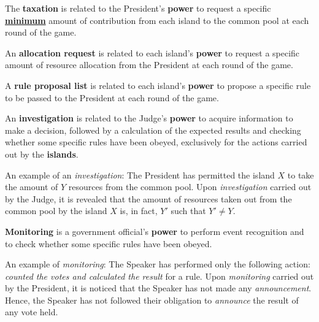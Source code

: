 

\begin{definition} \label{def:tax}
    The \textbf{taxation} is related to the President's \textbf{power} to request a specific \underline{\textbf{minimum}} amount of contribution from each island to the common pool at each round of the game.
\end{definition}

\begin{definition} \label{def:alloc_req}
    An \textbf{allocation request} is related to each island's \textbf{power} to request a specific amount of resource allocation from the President at each round of the game.
\end{definition}


\begin{definition} \label{def:rule_prop_list}
A \textbf{rule proposal list} is related to each island's \textbf{power} to propose a specific rule to be passed to the President at each round of the game.
\end{definition}

\begin{definition} \label{def:invst}
    An \textbf{investigation} is related to the Judge's \textbf{power} to acquire information to make a decision, followed by a calculation of the expected results and checking whether some specific rules have been obeyed, exclusively for the actions carried out by the \textbf{islands}.
\end{definition}


An example of an \emph{investigation}: The President has permitted the island $X$ to take the amount of $Y$ resources from the common pool. Upon \emph{investigation} carried out by the Judge, it is revealed that the amount of resources taken out from the common pool by the island $X$ is, in fact, $Y'$ such that $Y' \neq Y$.


\begin{definition}
\textbf{Monitoring} is a government official's \textbf{power} to perform event recognition and to check whether some specific rules have been obeyed.
\end{definition}

An example of \emph{monitoring}: The Speaker has performed only the following action: \emph{counted the votes and calculated the result} for a rule. Upon \emph{monitoring} carried out by the President, it is noticed that the Speaker has not made any \emph{announcement}. Hence, the Speaker has not followed their obligation to \emph{announce} the result of any vote held.

